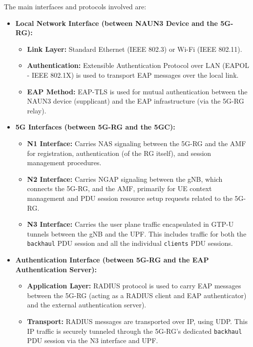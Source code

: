 The main interfaces and protocols involved are:
\begin{itemize}
    \item {
        \textbf{Local Network Interface (between \ac{NAUN3} Device and the \ac{5G-RG}):}
        \begin{itemize}
            \item \textbf{Link Layer:} Standard Ethernet (\ac{IEEE} 802.3) or Wi-Fi (\ac{IEEE} 802.11).
            \item \textbf{Authentication:} Extensible Authentication Protocol over \ac{LAN} (\ac{EAPOL} - \ac{IEEE} 802.1X) is used to transport \ac{EAP} messages over the local link.
            \item \textbf{EAP Method:} \ac{EAP-TLS} is used for mutual authentication between the \ac{NAUN3} device (supplicant) and the \ac{EAP} infrastructure (via the \ac{5G-RG} relay).
        \end{itemize}
    }
    \item {
        \textbf{\ac{5G} Interfaces (between \ac{5G-RG} and the \ac{5GC}):}
        \begin{itemize}
            \item \textbf{N1 Interface:} Carries \ac{NAS} signaling between the \ac{5G-RG} and the \ac{AMF} for registration, authentication (of the \ac{RG} itself), and session management procedures.
            \item \textbf{N2 Interface:} Carries \ac{NGAP} signaling between the \ac{gNB}, which connects the \ac{5G-RG}, and the \ac{AMF}, primarily for \ac{UE} context management and \ac{PDU} session resource setup requests related to the \ac{5G-RG}.
            \item \textbf{N3 Interface:} Carries the user plane traffic encapsulated in \ac{GTP-U} tunnels between the \ac{gNB} and the \ac{UPF}. This includes traffic for both the \texttt{backhaul} \ac{PDU} session and all the individual \texttt{clients} \ac{PDU} sessions.
        \end{itemize}
    }
    \item {
        \textbf{Authentication Interface (between \ac{5G-RG} and the \ac{EAP} Authentication Server):}
        \begin{itemize}
            \item \textbf{Application Layer:} \ac{RADIUS} protocol is used to carry \ac{EAP} messages between the \ac{5G-RG} (acting as a \ac{RADIUS} client and \ac{EAP} authenticator) and the external authentication server).
            \item \textbf{Transport:} \ac{RADIUS} messages are transported over \ac{IP}, using \ac{UDP}. This \ac{IP} traffic is securely tunneled through the \ac{5G-RG}'s dedicated \texttt{backhaul} \ac{PDU} session via the N3 interface and \ac{UPF}.
        \end{itemize}
    }
\end{itemize}

